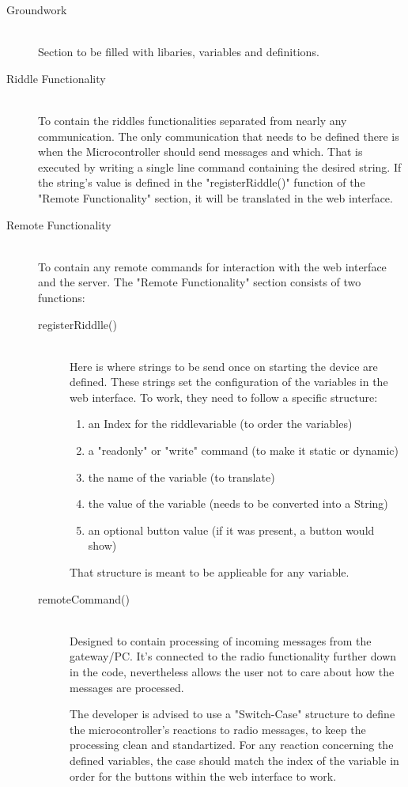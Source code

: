 \begin{description}
	\item [Groundwork]\hfill \\
	      Section to be filled with libaries, variables and definitions.
	\item [Riddle Functionality]\hfill \\
	      To contain the riddles functionalities separated from nearly any communication.
	      The only communication that needs to be defined there is when the Microcontroller should send messages and which.
	      That is executed by writing a single line command containing the desired string.
	      If the string's value is defined in the "registerRiddle()" function of the "Remote Functionality" section, it will be translated in the web interface.

	\item [Remote Functionality]\hfill \\
	      To contain any remote commands for interaction with the web interface and the server.
	      The "Remote Functionality" section consists of two functions:
	      \begin{description}
		      \item [registerRiddlle()]\hfill \\
		            Here is where strings to be send once on starting the device are defined.
		            These strings set the configuration of the variables in the web interface.
		            To work, they need to follow a specific structure:
		            \begin{enumerate}
			            \item an Index for the riddlevariable (to order the variables)
			            \item a "readonly" or "write" command (to make it static or dynamic)
			            \item the name of the variable (to translate)
			            \item the value of the variable (needs to be converted into a String)
			            \item an optional button value (if it was present, a button would show)
		            \end{enumerate}
		            That structure is meant to be applieable for any variable.
		      \item[remoteCommand()]\hfill \\
		            Designed to contain processing of incoming messages from the gateway/PC.
		            It's connected to the radio functionality further down in the code, nevertheless allows the user not to care about how the messages are processed.

		            The developer is advised to use a "Switch-Case" structure to define the microcontroller's reactions to radio messages, to keep the processing clean and standartized.
		            For any reaction concerning the defined variables, the case should match the index of the variable in order for the buttons within the web interface to work.

	      \end{description}

\end{description}
